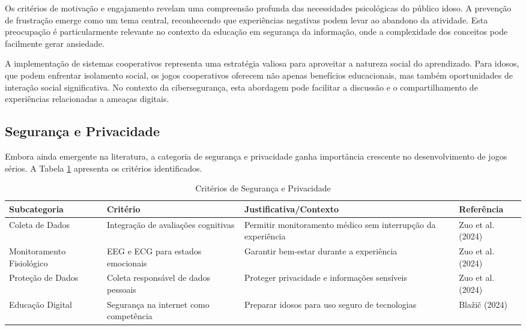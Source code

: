 Os critérios de motivação e engajamento revelam uma compreensão profunda das necessidades psicológicas do público idoso. A prevenção de frustração emerge como um tema central, reconhecendo que experiências negativas podem levar ao abandono da atividade. Esta preocupação é particularmente relevante no contexto da educação em segurança da informação, onde a complexidade dos conceitos pode facilmente gerar ansiedade.

A implementação de sistemas cooperativos representa uma estratégia valiosa para aproveitar a natureza social do aprendizado. Para idosos, que podem enfrentar isolamento social, os jogos cooperativos oferecem não apenas benefícios educacionais, mas também oportunidades de interação social significativa. No contexto da cibersegurança, esta abordagem pode facilitar a discussão e o compartilhamento de experiências relacionadas a ameaças digitais.

\subsection{Segurança e Privacidade}
\label{subsec:seguranca}

Embora ainda emergente na literatura, a categoria de segurança e privacidade ganha importância crescente no desenvolvimento de jogos sérios. A Tabela \ref{tab:seguranca} apresenta os critérios identificados.

\begin{table}[H]
\centering
\caption{Critérios de Segurança e Privacidade}
\label{tab:seguranca}
\begin{tabular}{p{2.5cm}p{3cm}p{5cm}p{3cm}}
\hline
\textbf{Subcategoria} & \textbf{Critério} & \textbf{Justificativa/Contexto} & \textbf{Referência} \\ \hline
Coleta de Dados & Integração de avaliações cognitivas & Permitir monitoramento médico sem interrupção da experiência & Zuo et al. (2024) \\
Monitoramento Fisiológico & EEG e ECG para estados emocionais & Garantir bem-estar durante a experiência & Zuo et al. (2024) \\
Proteção de Dados & Coleta responsável de dados pessoais & Proteger privacidade e informações sensíveis & Zuo et al. (2024) \\
Educação Digital & Segurança na internet como competência & Preparar idosos para uso seguro de tecnologias & Blažič (2024) \\
\hline
\end{tabular}
\end{table}

